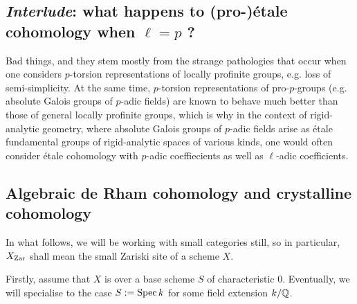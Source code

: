     \subsection{\textit{Interlude}: what happens to (pro-)\'etale cohomology when \texorpdfstring{$\ell = p$}{} ?}
        Bad things, and they stem mostly from the strange pathologies that occur when one considers $p$-torsion representations of locally profinite groups, e.g. loss of semi-simplicity. At the same time, $p$-torsion representations of pro-$p$-groups (e.g. absolute Galois groups of $p$-adic fields) are known to behave much better than those of general locally profinite groups, which is why in the context of rigid-analytic geometry, where absolute Galois groups of $p$-adic fields arise as \'etale fundamental groups of rigid-analytic spaces of various kinds, one would often consider \'etale cohomology with $p$-adic coeffiecients as well as $\ell$-adic coefficients. 

    \subsection{Algebraic de Rham cohomology and crystalline cohomology}
        In what follows, we will be working with small categories still, so in particular, $X_{\mathrm{Zar}}$ shall mean the small Zariski site of a scheme $X$.

        Firstly, assume that $X$ is over a base scheme $S$ of characteristic $0$. Eventually, we will specialise to the case $S := \operatorname{Spec} k$ for some field extension $k/\mathbb{Q}$. 
        \begin{definition} \label{def: de_rham_complexes}
            
        \end{definition}
        \begin{definition} \label{def: de_rham_stacks}
            
        \end{definition}
    
        \begin{theorem}
            
        \end{theorem}

